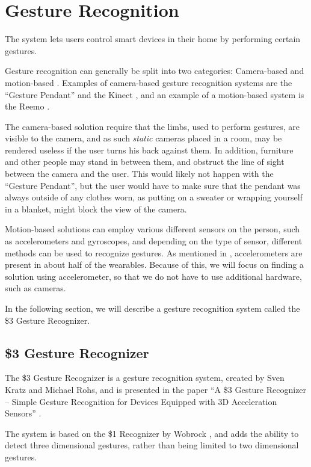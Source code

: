\section{Gesture Recognition}\label{sec:gesturerecognition}
The system lets users control smart devices in their home by performing certain gestures.

Gesture recognition can generally be split into two categories: 
Camera-based and motion-based \cite{Kela2006}. 
Examples of camera-based gesture recognition systems are the ``Gesture Pendant'' \cite{starner2000gesture} and the Kinect \cite{kinect}, 
and an example of a motion-based system is the Reemo \cite{Reemo}.

The camera-based solution require that the limbs, 
used to perform gestures, 
are visible to the camera, 
and as such \emph{static} cameras placed in a room, 
may be rendered useless if the user turns his back against them. 
In addition, furniture and other people may stand in between them, 
and obstruct the line of sight between the camera and the user.
This would likely not happen with the ``Gesture Pendant'', 
but the user would have to make sure that the pendant was always outside of any clothes worn, 
as putting on a sweater or wrapping yourself in a blanket, 
might block the view of the camera.

Motion-based solutions can employ various different sensors on the person,
such as accelerometers and gyroscopes, 
and depending on the type of sensor, 
different methods can be used to recognize gestures.
As mentioned in , accelerometers are present in about half of the wearables. 
Because of this, we will focus on finding a solution using accelerometer, 
so that we do not have to use additional hardware, such as cameras. 

In the following section, we will describe a gesture recognition system called the \$3 Gesture Recognizer. 


\subsection{\$3 Gesture Recognizer}\label{sec:threedollar}
The \$3 Gesture Recognizer is a gesture recognition system, 
created by Sven Kratz and Michael Rohs, 
and is presented in the paper ``A \$3 Gesture Recognizer – Simple Gesture Recognition for Devices Equipped with 3D Acceleration Sensors'' \cite{threedollar}.

The system is based on the \$1 Recognizer by Wobrock \etal \cite{wobbrock2007gestures}, 
and adds the ability to detect three dimensional gestures, 
rather than being limited to two dimensional gestures.


